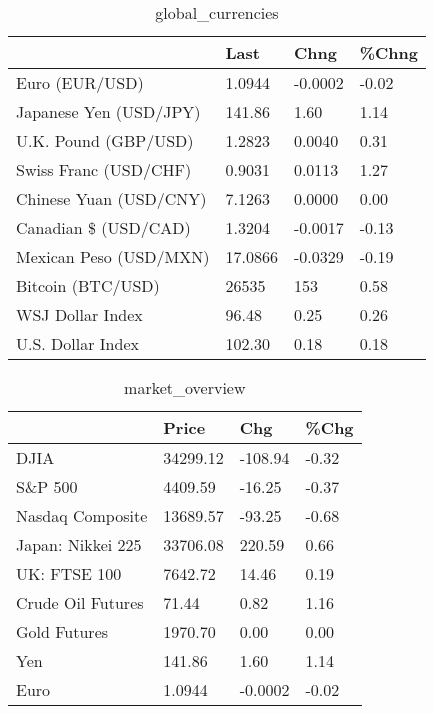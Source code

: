\documentclass{article}%
\begin{document}
%


\begin{table}[htbp]%
\caption{global\_currencies}%
\centering%
\begin{adjustbox}{width=1\textwidth}%
\begin{tabular}{llll}
\toprule
                       &    Last &    Chng & \%Chng \\
\midrule
        Euro (EUR/USD) &  1.0944 & -0.0002 & -0.02 \\
Japanese Yen (USD/JPY) &  141.86 &    1.60 &  1.14 \\
  U.K. Pound (GBP/USD) &  1.2823 &  0.0040 &  0.31 \\
 Swiss Franc (USD/CHF) &  0.9031 &  0.0113 &  1.27 \\
Chinese Yuan (USD/CNY) &  7.1263 &  0.0000 &  0.00 \\
  Canadian \$ (USD/CAD) &  1.3204 & -0.0017 & -0.13 \\
Mexican Peso (USD/MXN) & 17.0866 & -0.0329 & -0.19 \\
     Bitcoin (BTC/USD) &   26535 &     153 &  0.58 \\
      WSJ Dollar Index &   96.48 &    0.25 &  0.26 \\
     U.S. Dollar Index &  102.30 &    0.18 &  0.18 \\
\bottomrule
\end{tabular}
%
\end{adjustbox}%
\end{table}

%


\begin{table}[htbp]%
\caption{market\_overview}%
\centering%
\begin{adjustbox}{width=1\textwidth}%
\begin{tabular}{llll}
\toprule
                  &    Price &     Chg &  \%Chg \\
\midrule
             DJIA & 34299.12 & -108.94 & -0.32 \\
          S\&P 500 &  4409.59 &  -16.25 & -0.37 \\
 Nasdaq Composite & 13689.57 &  -93.25 & -0.68 \\
Japan: Nikkei 225 & 33706.08 &  220.59 &  0.66 \\
     UK: FTSE 100 &  7642.72 &   14.46 &  0.19 \\
Crude Oil Futures &    71.44 &    0.82 &  1.16 \\
     Gold Futures &  1970.70 &    0.00 &  0.00 \\
              Yen &   141.86 &    1.60 &  1.14 \\
             Euro &   1.0944 & -0.0002 & -0.02 \\
\bottomrule
\end{tabular}
%
\end{adjustbox}%
\end{table}

%
\end{document}
